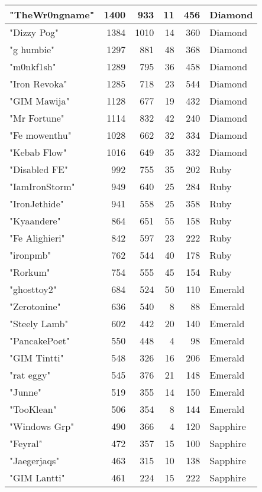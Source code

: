 \documentclass{article}
\begin{document}
\begin{table}[htbp]
\begin{tabular}{|l|r|r|r|r|l|}
"TheWr0ngname" & 1400 & 933 & 11 & 456 & Diamond \\ \hline
"Dizzy Pog" & 1384 & 1010 & 14 & 360 & Diamond \\ \hline
"g humbie" & 1297 & 881 & 48 & 368 & Diamond \\ \hline
"m0nkf1sh" & 1289 & 795 & 36 & 458 & Diamond \\ \hline
"Iron Revoka" & 1285 & 718 & 23 & 544 & Diamond \\ \hline
"GIM Mawija" & 1128 & 677 & 19 & 432 & Diamond \\ \hline
"Mr Fortune" & 1114 & 832 & 42 & 240 & Diamond \\ \hline
"Fe mowenthu" & 1028 & 662 & 32 & 334 & Diamond \\ \hline
"Kebab Flow" & 1016 & 649 & 35 & 332 & Diamond \\ \hline
"Disabled FE" & 992 & 755 & 35 & 202 & Ruby \\ \hline
"IamIronStorm" & 949 & 640 & 25 & 284 & Ruby \\ \hline
"IronJethide" & 941 & 558 & 25 & 358 & Ruby \\ \hline
"Kyaandere" & 864 & 651 & 55 & 158 & Ruby \\ \hline
"Fe Alighieri" & 842 & 597 & 23 & 222 & Ruby \\ \hline
"ironpmb" & 762 & 544 & 40 & 178 & Ruby \\ \hline
"Rorkum" & 754 & 555 & 45 & 154 & Ruby \\ \hline
"ghosttoy2" & 684 & 524 & 50 & 110 & Emerald \\ \hline
"Zerotonine" & 636 & 540 & 8 & 88 & Emerald \\ \hline
"Steely Lamb" & 602 & 442 & 20 & 140 & Emerald \\ \hline
"PancakePoet" & 550 & 448 & 4 & 98 & Emerald \\ \hline
"GIM Tintti" & 548 & 326 & 16 & 206 & Emerald \\ \hline
"rat eggy" & 545 & 376 & 21 & 148 & Emerald \\ \hline
"Junne" & 519 & 355 & 14 & 150 & Emerald \\ \hline
"TooKlean" & 506 & 354 & 8 & 144 & Emerald \\ \hline
"Windows Grp" & 490 & 366 & 4 & 120 & Sapphire \\ \hline
"Feyral" & 472 & 357 & 15 & 100 & Sapphire \\ \hline
"Jaegerjaqs" & 463 & 315 & 10 & 138 & Sapphire \\ \hline
"GIM Lantti" & 461 & 224 & 15 & 222 & Sapphire \\ \hline

\end{tabular}
\end{table}
\end{document}
